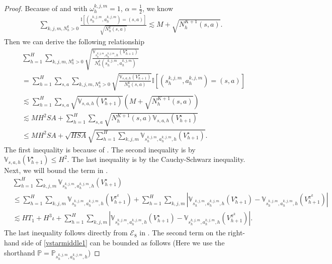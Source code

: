 \documentclass{article}
\begin{document}
\begin{proof}
Because of  and  with $\omega_h^{k,j,m}=1$, $\alpha = \frac{1}{2}$, we know
\begin{align}
    \label{nsqrtN}
    \sum_{k,j,m,N_h^k >0}\frac{\mathbb{I}\left[(s_h^{k,j,m}, a_h^{k,j,m})=(s,a)\right]}{\sqrt{N_h^k(s,a)}}\lesssim M + \sqrt{N_h^{K+1}(s,a)}.
\end{align}
Then we can derive the following relationship
    \begin{align}
    \label{vstarbegin}
        &\sum_{h=1}^H\sum_{k,j,m,N_h^k >0}\sqrt{\frac{\mathbb{V}_{s_h^{k,j,m}, a_h^{k,j,m}, h} (V_{h+1}^{\star})}{N_h^k(s_h^{k,j,m}, a_h^{k,j,m})}} \nonumber\\
        &= \sum_{h=1}^H\sum_{s,a}\sum_{k,j,m,N_h^k >0}\sqrt{\frac{\mathbb{V}_{s, a, h} (V_{h+1}^{\star})}{N_h^k(s,a)}} \mathbb{I}\left[(s_h^{k,j,m},a_h^{k,j,m}) = (s,a)\right] \nonumber\\
        & \lesssim \sum_{h=1}^H\sum_{s,a}\sqrt{\mathbb{V}_{s, a, h} (V_{h+1}^{\star})}\left(M + \sqrt{N_h^{K+1}(s,a)}\right)\nonumber\\
        &\lesssim MH^2SA+\sum_{h=1}^H\sum_{s,a}\sqrt{N_h^{K+1}(s,a)\mathbb{V}_{s, a, h} (V_{h+1}^{\star})} \nonumber\\
        &\leq MH^2SA+\sqrt{HSA}\sqrt{\sum_{h=1}^H\sum_{k,j,m}\mathbb{V}_{s_h^{k,j,m}, a_h^{k,j,m}, h} (V_{h+1}^{\star})}.
    \end{align}
    The first inequality is because of . The second inequality is by $\mathbb{V}_{s, a, h} (V_{h+1}^{\star}) \leq H^2$. The last inequality is by the Cauchy-Schwarz inequality. Next, we will bound the term in .
    \begin{align}
    \label{vstarmiddle1}
        &\sum_{h=1}^H\sum_{k,j,m}\mathbb{V}_{s_h^{k,j,m}, a_h^{k,j,m}, h} (V_{h+1}^{\star}) \nonumber\\
        &\leq \sum_{h=1}^H\sum_{k,j,m}\mathbb{V}_{s_h^{k,j,m}, a_h^{k,j,m}, h} (V_{h+1}^{\pi^k}) + \sum_{h=1}^H\sum_{k,j,m}\left|\mathbb{V}_{s_h^{k,j,m}, a_h^{k,j,m}, h} (V_{h+1}^{\star})-\mathbb{V}_{s_h^{k,j,m}, a_h^{k,j,m}, h} (V_{h+1}^{\pi^k})\right|\nonumber\\
        &\lesssim HT_1 + H^3\iota + \sum_{h=1}^H\sum_{k,j,m}\left|\mathbb{V}_{s_h^{k,j,m}, a_h^{k,j,m}, h} (V_{h+1}^{\star})-\mathbb{V}_{s_h^{k,j,m}, a_h^{k,j,m}, h} (V_{h+1}^{\pi^k})\right|.
    \end{align}
    The last inequality follows directly from $\mathcal{E}_8$ in . The second term on the right-hand side of \cref{vstarmiddle1} can be bounded as follows (Here we use the shorthand $\mathbb{P} = \mathbb{P}_{s_h^{k,j,m}, a_h^{k,j,m},h}$)

\end{proof}
\end{document}
